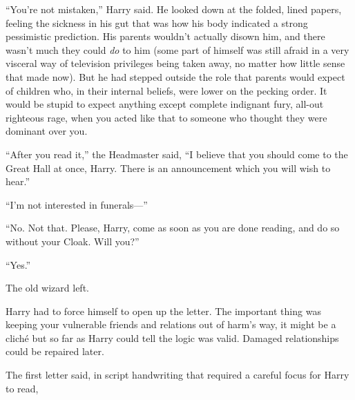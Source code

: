 “You’re not mistaken,” Harry said. He looked down at the folded, lined papers, feeling the sickness in his gut that was how his body indicated a strong pessimistic prediction. His parents wouldn’t actually disown him, and there wasn’t much they could \emph{do} to him (some part of himself was still afraid in a very visceral way of television privileges being taken away, no matter how little sense that made now). But he had stepped outside the role that parents would expect of children who, in their internal beliefs, were lower on the pecking order. It would be stupid to expect anything except complete indignant fury, all-out righteous rage, when you acted like that to someone who thought they were dominant over you.

“After you read it,” the Headmaster said, “I believe that you should come to the Great Hall at once, Harry. There is an announcement which you will wish to hear.”

“I’m not interested in funerals—”

“No. Not that. Please, Harry, come as soon as you are done reading, and do so without your Cloak. Will you?”

“Yes.”

The old wizard left.

Harry had to force himself to open up the letter. The important thing was keeping your vulnerable friends and relations out of harm’s way, it might be a cliché but so far as Harry could tell the logic was valid. Damaged relationships could be repaired later.

The first letter said, in script handwriting that required a careful focus for Harry to read,

